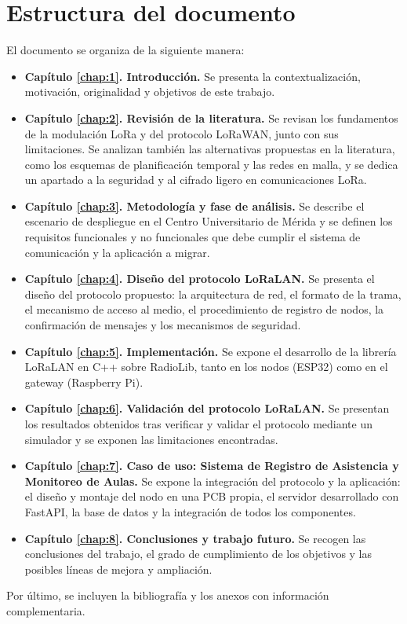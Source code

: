 \section{Estructura del documento}


El documento se organiza de la siguiente manera:

\begin{itemize}
    \item \textbf{Capítulo \ref{chap:1}. Introducción.} Se presenta la contextualización, motivación, originalidad y objetivos de este trabajo.

    \item \textbf{Capítulo \ref{chap:2}. Revisión de la literatura.} Se revisan los fundamentos de la modulación LoRa y del protocolo LoRaWAN, junto con sus limitaciones. Se analizan también las alternativas propuestas en la literatura, como los esquemas de planificación temporal y las redes en malla, y se dedica un apartado a la seguridad y al cifrado ligero en comunicaciones LoRa.

    \item \textbf{Capítulo \ref{chap:3}. Metodología y fase de análisis.} Se describe el escenario de despliegue en el Centro Universitario de Mérida y se definen los requisitos funcionales y no funcionales que debe cumplir el sistema de comunicación y la aplicación a migrar.

    \item \textbf{Capítulo \ref{chap:4}. Diseño del protocolo LoRaLAN.} Se presenta el diseño del protocolo propuesto: la arquitectura de red, el formato de la trama, el mecanismo de acceso al medio, el procedimiento de registro de nodos, la confirmación de mensajes y los mecanismos de seguridad.

    \item \textbf{Capítulo \ref{chap:5}. Implementación.} Se expone el desarrollo de la librería LoRaLAN en C++ sobre RadioLib, tanto en los nodos (ESP32) como en el gateway (Raspberry Pi).

    \item \textbf{Capítulo \ref{chap:6}. Validación del protocolo LoRaLAN.} Se presentan los resultados obtenidos tras verificar y validar el protocolo mediante un simulador y se exponen las limitaciones encontradas.

    \item \textbf{Capítulo \ref{chap:7}. Caso de uso: Sistema de Registro de Asistencia y Monitoreo de Aulas.} Se expone la integración del protocolo y la aplicación: el diseño y montaje del nodo en una PCB propia, el servidor desarrollado con FastAPI, la base de datos y la integración de todos los componentes.

    \item \textbf{Capítulo \ref{chap:8}. Conclusiones y trabajo futuro.} Se recogen las conclusiones del trabajo, el grado de cumplimiento de los objetivos y las posibles líneas de mejora y ampliación.
\end{itemize}

Por último, se incluyen la bibliografía y los anexos con información complementaria.